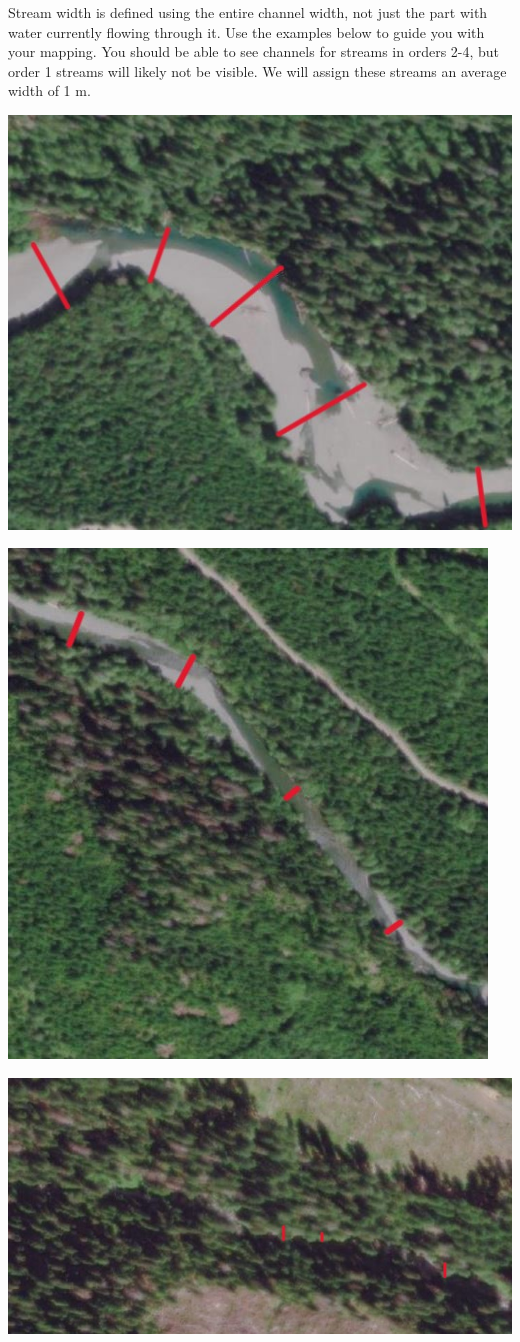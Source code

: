 \documentclass[
]{book}
\begin{document}
Stream width is defined using the entire channel width, not just the part with water currently flowing through it. Use the examples below to guide you with your mapping. You should be able to see channels for streams in orders 2-4, but order 1 streams will likely not be visible. We will assign these streams an average width of 1 m.

\includegraphics[width=0.75\linewidth]{images/03-s4-stream}

\includegraphics[width=0.75\linewidth]{images/03-s3-stream}

\includegraphics[width=0.75\linewidth]{images/03-s2-stream}
\end{document}
